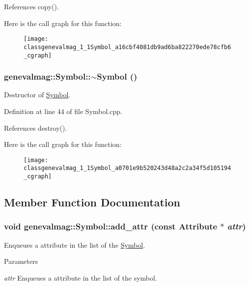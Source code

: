 References copy().



Here is the call graph for this function:\nopagebreak
\begin{figure}[H]
\begin{center}
\leavevmode
\texttt{[image: classgenevalmag\_1\_1Symbol\_a16cbf4081db9ad6ba822270ede78cfb6\_cgraph]}
\end{center}
\end{figure}


\hypertarget{classgenevalmag_1_1Symbol_a0701e9b520243d48a2c2a34f5d105194}{
\subsubsection[{$\sim$Symbol}]{\setlength{\rightskip}{0pt plus 5cm}genevalmag::Symbol::$\sim$Symbol ()}}
\label{classgenevalmag_1_1Symbol_a0701e9b520243d48a2c2a34f5d105194}
Destructor of \hyperlink{classgenevalmag_1_1Symbol}{Symbol}. 

Definition at line 44 of file Symbol.cpp.



References destroy().



Here is the call graph for this function:\nopagebreak
\begin{figure}[H]
\begin{center}
\leavevmode
\texttt{[image: classgenevalmag\_1\_1Symbol\_a0701e9b520243d48a2c2a34f5d105194\_cgraph]}
\end{center}
\end{figure}




\subsection{Member Function Documentation}
\hypertarget{classgenevalmag_1_1Symbol_a41ceb415014d2cfbb5976c3fd2bbf35f}{
\subsubsection[{add\_\-attr}]{\setlength{\rightskip}{0pt plus 5cm}void genevalmag::Symbol::add\_\-attr (const {\bf Attribute} $\ast$ {\em attr})}}
\label{classgenevalmag_1_1Symbol_a41ceb415014d2cfbb5976c3fd2bbf35f}
Enqueues a attribute in the list of the \hyperlink{classgenevalmag_1_1Symbol}{Symbol}. 
\begin{DoxyParams}{Parameters}
\item[{\em attr}]Enqueues a attribute in the list of the symbol. \end{DoxyParams}


